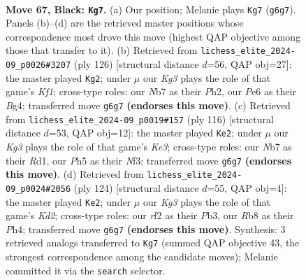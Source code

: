 \documentclass[11pt]{article}
\begin{document}
\clearpage

\begin{figure}[p]\centering
\begin{subfigure}{0.46\textwidth}\centering
\resizebox{\linewidth}{!}{%
\newchessgame
\chessboard[
  setfen={1r6/pn5r/1p2p1k1/4P2p/2P5/2K3PR/P1NB1R2/8 b - - 6 67},
  showmover=false,
  pgfstyle=straightmove, color=movearrow, markmove={g6-g7}
]}
\caption{}
\end{subfigure}\hfill
\begin{subfigure}{0.46\textwidth}\centering
\resizebox{\linewidth}{!}{%
\newchessgame
\chessboard[
  setfen={5r2/6pk/6p1/1P1nr3/4p1B1/4P3/5P1P/1RR2K2 w - - 25 64},
  showmover=false,
  pgfstyle=straightmove, color=movearrow, markmove={f1-g2}
]}
\caption{}
\end{subfigure}
\\[4pt]
\begin{subfigure}{0.46\textwidth}\centering
\resizebox{\linewidth}{!}{%
\newchessgame
\chessboard[
  setfen={2r5/kp6/5p2/p1bP1R2/P3P3/1P2KN1r/8/3R4 w - - 30 59},
  showmover=false,
  pgfstyle=straightmove, color=movearrow, markmove={e3-e2}
]}
\caption{}
\end{subfigure}\hfill
\begin{subfigure}{0.46\textwidth}\centering
\resizebox{\linewidth}{!}{%
\newchessgame
\chessboard[
  setfen={4r3/1ppN4/8/p1P3P1/3Rbk1P/PP4p1/3K4/8 w - - 0 63},
  showmover=false,
  pgfstyle=straightmove, color=movearrow, markmove={d2-e2}
]}
\caption{}
\end{subfigure}
\caption{\textbf{Move 67, Black: \texttt{Kg7}.} (a) Our position; Melanie plays \texttt{Kg7} (\texttt{g6g7}). Panels (b)--(d) are the retrieved master positions whose correspondence most drove this move (highest QAP objective among those that transfer to it). (b) Retrieved from \texttt{lichess\_elite\_2024-09\_p0026\#3207} (ply 126) [structural distance $d$=56, QAP obj=27]: the master played \texttt{Kg2}; under $\mu$ our \emph{Kg3} plays the role of that game's \emph{Kf1}; cross-type roles: our \emph{N}b7 as their \emph{P}h2, our \emph{P}e6 as their \emph{B}g4; transferred move \texttt{g6g7} \textbf{(endorses this move)}. (c) Retrieved from \texttt{lichess\_elite\_2024-09\_p0019\#157} (ply 116) [structural distance $d$=53, QAP obj=12]: the master played \texttt{Ke2}; under $\mu$ our \emph{Kg3} plays the role of that game's \emph{Ke3}; cross-type roles: our \emph{N}b7 as their \emph{R}d1, our \emph{P}h5 as their \emph{N}f3; transferred move \texttt{g6g7} \textbf{(endorses this move)}. (d) Retrieved from \texttt{lichess\_elite\_2024-09\_p0024\#2056} (ply 124) [structural distance $d$=55, QAP obj=4]: the master played \texttt{Ke2}; under $\mu$ our \emph{Kg3} plays the role of that game's \emph{Kd2}; cross-type roles: our \emph{r}f2 as their \emph{P}b3, our \emph{R}b8 as their \emph{P}h4; transferred move \texttt{g6g7} \textbf{(endorses this move)}. Synthesis: 3 retrieved analogs transferred to \texttt{Kg7} (summed QAP objective 43, the strongest correspondence among the candidate moves); Melanie committed it via the \texttt{search} selector.}
\label{fig:thought-m133}
\end{figure}
\end{document}
